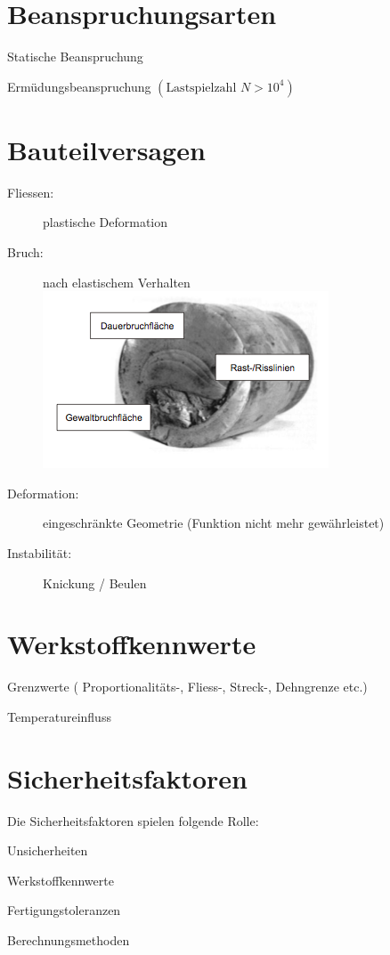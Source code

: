 \section{Beanspruchungsarten} %
	\begin{tightitemize}
		\item Statische Beanspruchung
		\item Ermüdungsbeanspruchung $(\text{Lastspielzahl } N >10^4)$
	\end{tightitemize}
\section{Bauteilversagen} %
	\begin{description}
		\item[Fliessen:] plastische Deformation
		\item[Bruch:] nach elastischem Verhalten\\
			\includegraphics[width=0.6\columnwidth]{graphics/bruchbild}
		\item[Deformation:] eingeschränkte Geometrie (Funktion nicht mehr ge\-währ\-leistet)
		\item[Instabilität:] Knickung / Beulen
	\end{description}
\section{Werkstoffkennwerte} %
	\begin{tightitemize}
		\item Grenzwerte ( Proportionalitäts-, Fliess-, Streck-, Dehngrenze etc.)
		\item Temperatureinfluss
	\end{tightitemize}
\section{Sicherheitsfaktoren} %
	Die Sicherheitsfaktoren spielen folgende Rolle:
	\begin{tightitemize}
		\item Unsicherheiten
		\item Werkstoffkennwerte
		\item Fertigungstoleranzen
		\item Berechnungsmethoden
	\end{tightitemize}
